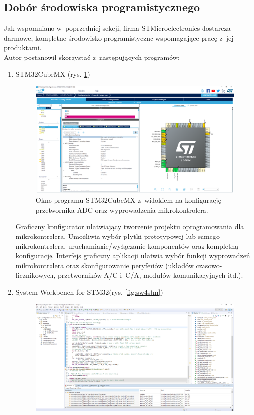 \subsection{Dobór środowiska programistycznego}
\label{sec:IDE}
Jak wspomniano w~poprzedniej sekcji, firma STMicroelectronics dostarcza darmowe, kompletne środowisko programistyczne wspomagające pracę z~jej produktami.\\
Autor postanowił skorzystać z~następujących programów:
\begin{enumerate}
	\item STM32CubeMX (rys. \ref{fig:cubemx})\\
	\begin{figure}[h!]
		\centering
		\includegraphics[scale=0.3]{../Assets/stm32CubeMX.png}
		\caption{Okno programu STM32CubeMX z~widokiem na konfigurację przetwornika ADC oraz wyprowadzenia mikrokontrolera.}
		\label{fig:cubemx}
	\end{figure}
	Graficzny konfigurator ułatwiający tworzenie projektu oprogramowania dla mikrokontrolera. Umożliwia wybór płytki prototypowej lub samego mikrokontrolera, uruchamianie/wyłączanie komponentów oraz kompletną konfigurację. Interfejs graficzny aplikacji ułatwia wybór funkcji wyprowadzeń mikrokontrolera oraz skonfigurowanie peryferiów (układów czasowo-licznikowych, przetworników A/C i~C/A, modułów komunikacyjnych itd.).
	\item System Workbench for STM32(rys. \ref{fig:sw4stm})\\
	\begin{figure}[h!]
		\centering
		\includegraphics[scale=0.3]{../Assets/sw4stm32.png}

\end{figure}
\end{enumerate}
